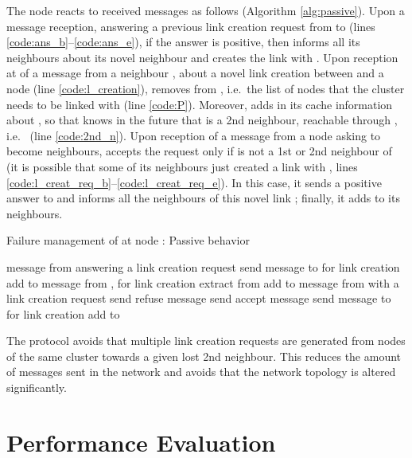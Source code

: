 \documentclass{www13-companion-accepted}
\begin{document}
The node reacts to received messages as follows (Algorithm \ref{alg:passive}). Upon a message reception, answering a previous link creation request from  to  (lines \ref{code:ans_b}--\ref{code:ans_e}), if the answer is positive, then  informs all its neighbours about its novel neighbour and creates the link with . 
Upon reception at  of a message from a neighbour , about a novel link creation between  and a node  (line \ref{code:l_creation}),  removes  from , i.e.~the list of nodes that the cluster needs to be linked with (line \ref{code:P}). Moreover,  adds in its cache information about , so that  knows in the future that  is a 2nd neighbour, reachable through , i.e.~ (line \ref{code:2nd_n}). 
Upon reception of a message from a node  asking  to become neighbours,  accepts the request only if  is not a 1st or 2nd neighbour of  (it is possible that some of its neighbours just created a link with , lines \ref{code:l_creat_req_b}--\ref{code:l_creat_req_e}). In this case, it sends a positive answer to  and informs all the  neighbours of this novel link ; finally, it adds  to its neighbours.


\begin{algorithm}[htbp]
\caption{Failure management of  at node : Passive behavior}
\label{alg:passive}
\begin{algorithmic}[1]
\State \label{code:P}
\Statex 
\Require message from  answering a link creation request
  \label{code:ans_b}
    \ForAll{}
      \State send message to  for link creation 
    \EndFor
    \State add  to 
  \EndIf\label{code:ans_e}
\Statex 
\Require message from , for link creation 
  \State extract  from \label{code:l_creation}
  \State add  to \label{code:2nd_n}
\Statex 
\Require message from  with a link creation request
  \If{}\label{code:l_creat_req_b}
    \State send refuse message
  \Else
    \State send accept message
    \ForAll{}
      \State send message to  for link creation 
    \EndFor
    \State add  to 
  \EndIf\label{code:l_creat_req_e}
\end{algorithmic}
\end{algorithm}




The protocol avoids that multiple link creation requests are generated from nodes of the same cluster towards a given lost 2nd neighbour. This reduces the amount of messages sent in the network and avoids that the network topology is altered significantly. 




\section{Performance Evaluation}\label{sec:eval}
\end{document}
